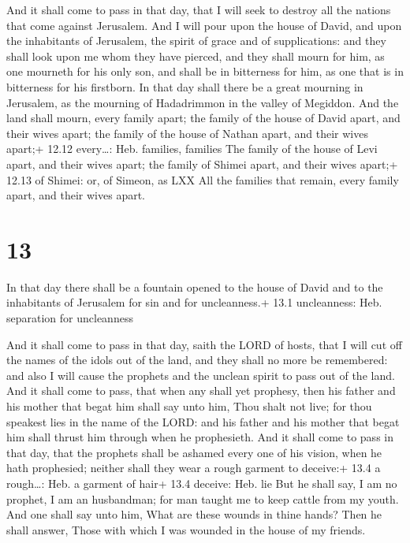 And it shall come to pass in that day, that I will seek
to destroy all the nations that come against Jerusalem. 
And I will pour upon the house of David, and upon the inhabitants of
Jerusalem, the spirit of grace and of supplications: and they shall look
upon me whom they have pierced, and they shall mourn for him, as one
mourneth for his only son, and shall be in bitterness for him, as one
that is in bitterness for his firstborn.  In that day shall
there be a great mourning in Jerusalem, as the mourning of Hadadrimmon
in the valley of Megiddon.  And the land shall mourn, every
family apart; the family of the house of David apart, and their wives
apart; the family of the house of Nathan apart, and their wives apart;+
12.12 every\ldots: Heb. families, families  The family of
the house of Levi apart, and their wives apart; the family of Shimei
apart, and their wives apart;+ 12.13 of Shimei: or, of Simeon, as LXX
 All the families that remain, every family apart, and
their wives apart.

\hypertarget{section-12}{%
\section{13}\label{section-12}}

 In that day there shall be a fountain opened to the house
of David and to the inhabitants of Jerusalem for sin and for
uncleanness.+ 13.1 uncleanness: Heb. separation for uncleanness

 And it shall come to pass in that day, saith the LORD of
hosts, that I will cut off the names of the idols out of the land, and
they shall no more be remembered: and also I will cause the prophets and
the unclean spirit to pass out of the land.  And it shall
come to pass, that when any shall yet prophesy, then his father and his
mother that begat him shall say unto him, Thou shalt not live; for thou
speakest lies in the name of the LORD: and his father and his mother
that begat him shall thrust him through when he prophesieth.
 And it shall come to pass in that day, that the prophets
shall be ashamed every one of his vision, when he hath prophesied;
neither shall they wear a rough garment to deceive:+ 13.4 a rough\ldots:
Heb. a garment of hair+ 13.4 deceive: Heb. lie  But he shall
say, I am no prophet, I am an husbandman; for man taught me to keep
cattle from my youth.  And one shall say unto him, What are
these wounds in thine hands? Then he shall answer, Those with which I
was wounded in the house of my friends.

